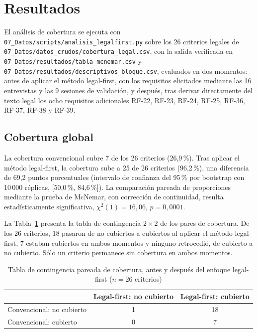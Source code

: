 \documentclass[pdflatex,sn-mathphys-num]{sn-jnl}
\begin{document}
\section{Resultados}\label{sec:resultados}

El an\'alisis de cobertura se ejecuta con \texttt{07\_Datos/scripts/analisis\_legalfirst.py} sobre los 26 criterios legales de \texttt{07\_Datos/datos\_crudos/cobertura\_legal.csv}, con la salida verificada en \texttt{07\_Datos/resultados/tabla\_mcnemar.csv} y \texttt{07\_Datos/resultados/descriptivos\_bloque.csv}, evaluados en dos momentos: antes de aplicar el m\'etodo legal-first, con los requisitos elicitados mediante las 16 entrevistas y las 9 sesiones de validaci\'on, y despu\'es, tras derivar directamente del texto legal los ocho requisitos adicionales RF-22, RF-23, RF-24, RF-25, RF-36, RF-37, RF-38 y RF-39.

\subsection{Cobertura global}

La cobertura convencional cubre 7 de los 26 criterios (26,9\,\%). Tras aplicar el m\'etodo legal-first, la cobertura sube a 25 de 26 criterios (96,2\,\%), una diferencia de 69,2 puntos porcentuales (intervalo de confianza del 95\,\% por bootstrap con 10\,000 r\'eplicas, [50,0\,\%, 84,6\,\%]). La comparaci\'on pareada de proporciones mediante la prueba de McNemar, con correcci\'on de continuidad, resulta estad\'isticamente significativa, $\chi^2(1)=16,06$, $p=0,0001$.

La Tabla~\ref{tab:mcnemar} presenta la tabla de contingencia $2\times2$ de los pares de cobertura. De los 26 criterios, 18 pasaron de no cubiertos a cubiertos al aplicar el m\'etodo legal-first, 7 estaban cubiertos en ambos momentos y ninguno retrocedi\'o, de cubierto a no cubierto. S\'olo un criterio permanece sin cobertura en ambos momentos.

\begin{table}[htbp]
\caption{Tabla de contingencia pareada de cobertura, antes y despu\'es del enfoque legal-first ($n=26$ criterios)}\label{tab:mcnemar}
\begin{tabular}{@{}lcc@{}}
\toprule
 & Legal-first: no cubierto & Legal-first: cubierto \\
\midrule
Convencional: no cubierto & 1 & 18 \\
Convencional: cubierto & 0 & 7 \\
\bottomrule
\end{tabular}
\end{table}
\end{document}
